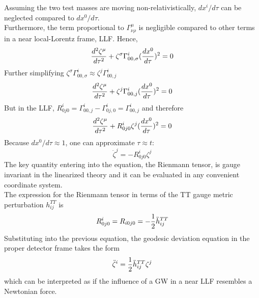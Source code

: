 \documentclass[binding=0.6cm, LaM]{sapthesis}
\begin{document}
        Assuming the two test masses are moving non-relativistically, $dx^i/d\tau$ can be neglected compared to $dx^0/d\tau$. \\
        Furthermore, the term proportional to $\Gamma^{\mu}_{\nu\rho}$ is negligible compared to other terms in a near  local-Lorentz frame, LLF. Hence,
                \begin{equation}
                	{{d^2\zeta^{\mu}}\over{d\tau^2}} + \zeta^{\sigma}\Gamma^{i}_{00, \sigma}({{dx^0}\over{d\tau}})^2 = 0
                \end{equation}
        Further simplifying $\zeta^{\sigma}\Gamma^{i}_{00, \sigma} \approx \zeta^{j}\Gamma^{i}_{00, j}$
                \begin{equation}
                	{{d^2\zeta^{\mu}}\over{d\tau^2}} + \zeta^{j}\Gamma^{i}_{00,j}({{dx^0}\over{d\tau}})^2 = 0
                \end{equation}
        But in the LLF, $R^i_{0j0} = \Gamma^i_{00,j} - \Gamma^i_{0j,0} = \Gamma^i_{00,j}$ and therefore
                \begin{equation}
                	{{d^2\zeta^{\mu}}\over{d\tau^2}} + R^i_{0j0} \zeta^j({{dx^0}\over{d\tau}})^2 = 0
                \end{equation}
        Because $dx^0/d\tau \approx 1$, one can approximate $\tau \approx t$:
                \begin{equation}
                	{\ddot \zeta}^j = - R^i_{0j0}\zeta^j
                \end{equation}
        The key quantity entering into the equation, the Rienmann tensor, is gauge invariant in the linearized theory and
        it can be evaluated in any convenient coordinate system. \\
        The expression for the Rienmann tensor in terms of the TT gauge metric perturbation $h_{ij}^{TT}$ is
                \begin{equation}
                	R^i_{0j0} = R_{i0j0} = - {1 \over 2}{\ddot h}_{ij}^{TT}
                \end{equation}
        Substituting into the previous equation, the geodesic deviation equation in the proper detector frame takes the form
                \begin{equation}
                	{\ddot \zeta}^i = {1 \over 2}{\ddot h}_{ij}^{TT}\zeta^j
                \end{equation}
        which can be interpreted as if the influence of a GW in a near LLF resembles a Newtonian force. \\
\end{document}

